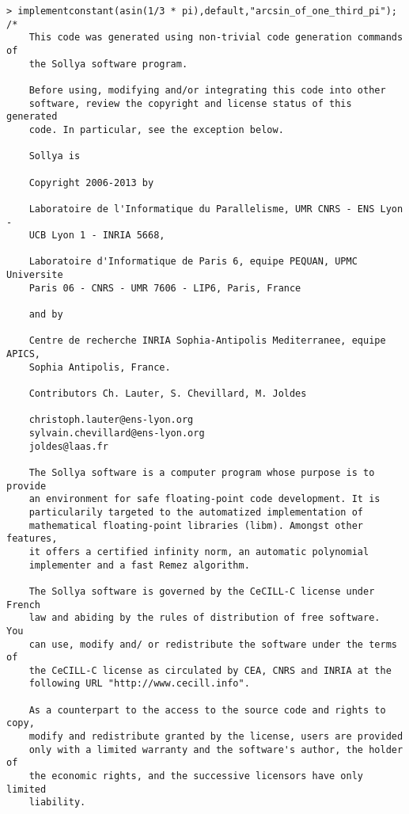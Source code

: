\begin{center}\begin{minipage}{15cm}\begin{Verbatim}[frame=single]
> implementconstant(asin(1/3 * pi),default,"arcsin_of_one_third_pi");
/*
    This code was generated using non-trivial code generation commands of
    the Sollya software program.
    
    Before using, modifying and/or integrating this code into other
    software, review the copyright and license status of this generated
    code. In particular, see the exception below.
    
    Sollya is
    
    Copyright 2006-2013 by
    
    Laboratoire de l'Informatique du Parallelisme, UMR CNRS - ENS Lyon -
    UCB Lyon 1 - INRIA 5668,
    
    Laboratoire d'Informatique de Paris 6, equipe PEQUAN, UPMC Universite
    Paris 06 - CNRS - UMR 7606 - LIP6, Paris, France
    
    and by
    
    Centre de recherche INRIA Sophia-Antipolis Mediterranee, equipe APICS,
    Sophia Antipolis, France.
    
    Contributors Ch. Lauter, S. Chevillard, M. Joldes
    
    christoph.lauter@ens-lyon.org
    sylvain.chevillard@ens-lyon.org
    joldes@laas.fr
    
    The Sollya software is a computer program whose purpose is to provide
    an environment for safe floating-point code development. It is
    particularily targeted to the automatized implementation of
    mathematical floating-point libraries (libm). Amongst other features,
    it offers a certified infinity norm, an automatic polynomial
    implementer and a fast Remez algorithm.
    
    The Sollya software is governed by the CeCILL-C license under French
    law and abiding by the rules of distribution of free software.  You
    can use, modify and/ or redistribute the software under the terms of
    the CeCILL-C license as circulated by CEA, CNRS and INRIA at the
    following URL "http://www.cecill.info".
    
    As a counterpart to the access to the source code and rights to copy,
    modify and redistribute granted by the license, users are provided
    only with a limited warranty and the software's author, the holder of
    the economic rights, and the successive licensors have only limited
    liability.
    

\end{Verbatim}
\end{minipage}
\end{center}
